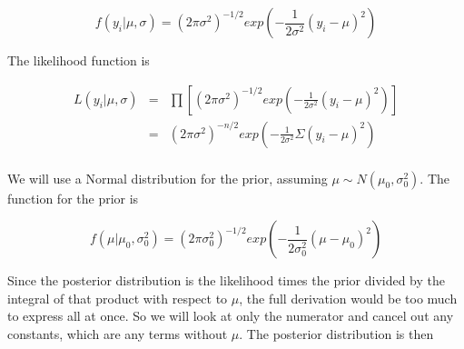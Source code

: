 \documentclass[12pt]{article}
\begin{document}
\[f(y_i|\mu,\sigma)=(2\pi\sigma^2)^{-1/2}exp\left(-\frac{1}{2\sigma^2}(y_i-\mu)^2\right)\]

\noindent The likelihood function is

\begin{eqnarray*}
L(y_i|\mu,\sigma) &=& \prod\left[(2\pi\sigma^2)^{-1/2}exp\left(-\frac{1}{2\sigma^2}(y_i-\mu)^2\right)\right] \\
&=& (2\pi\sigma^2)^{-n/2}exp\left(-\frac{1}{2\sigma^2}\Sigma(y_i-\mu)^2\right) \\
\end{eqnarray*}

\noindent We will use a Normal distribution for the prior, assuming $\mu\sim N(\mu_0,\sigma_0^2)$.  The function for the prior is

\[f(\mu|\mu_0,\sigma_0^2)= (2\pi\sigma_0^2)^{-1/2}exp\left(-\frac{1}{2\sigma_0^2}(\mu-\mu_0)^2\right)\]

\noindent Since the posterior distribution is the likelihood times the prior divided by the integral of that product with respect to $\mu$, the full derivation would be too much to express all at once.  So we will look at only the numerator and cancel out any constants, which are any terms without $\mu$.  The posterior distribution is then
\end{document}
